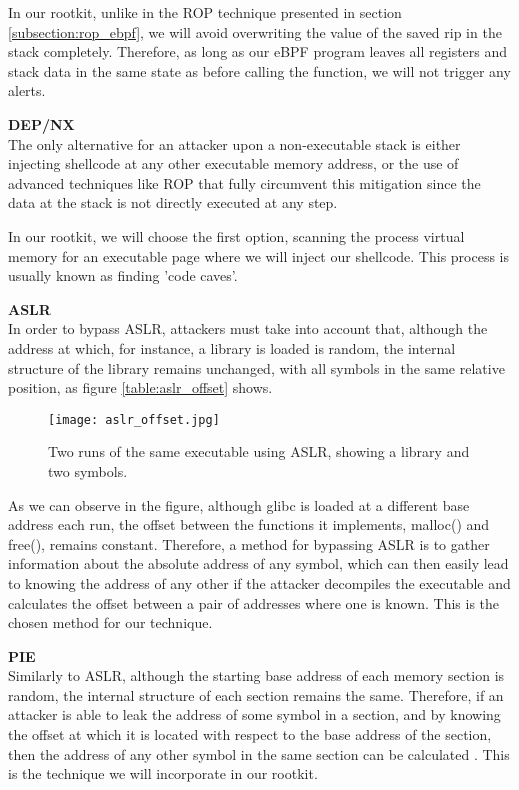 In our rootkit, unlike in the ROP technique presented in section \ref{subsection:rop_ebpf}, we will avoid overwriting the value of the saved rip in the stack completely. Therefore, as long as our eBPF program leaves all registers and stack data in the same state as before calling the function, we will not trigger any alerts.

\textbf{DEP/NX}\\
The only alternative for an attacker upon a non-executable stack is either injecting shellcode at any other executable memory address, or the use of advanced techniques like ROP that fully circumvent this mitigation since the data at the stack is not directly executed at any step.

In our rootkit, we will choose the first option, scanning the process virtual memory for an executable page where we will inject our shellcode. This process is usually known as finding 'code caves'.

\textbf{ASLR}\\
In order to bypass ASLR, attackers must take into account that, although the address at which, for instance, a library is loaded is random, the internal structure of the library remains unchanged, with all symbols in the same relative position, as figure \ref{table:aslr_offset} shows.

\begin{figure}[htbp]
	\centering
	\texttt{[image: aslr\_offset.jpg]}
	\caption{Two runs of the same executable using ASLR, showing a library and two symbols.}
	\label{fig:alsr_offset}
\end{figure}

As we can observe in the figure, although glibc is loaded at a different base address each run, the offset between the functions it implements, malloc() and free(), remains constant. Therefore, a method for bypassing ASLR is to gather information about the absolute address of any symbol, which can then easily lead to knowing the address of any other if the attacker decompiles the executable and calculates the offset between a pair of addresses where one is known. This is the chosen method for our technique.

\textbf{PIE}\\
Similarly to ASLR, although the starting base address of each memory section is random, the internal structure of each section remains the same. Therefore, if an attacker is able to leak the address of some symbol in a section, and by knowing the offset at which it is located with respect to the base address of the section, then the address of any other symbol in the same section can be calculated \cite{pie_exploit}. This is the technique we will incorporate in our rootkit.

